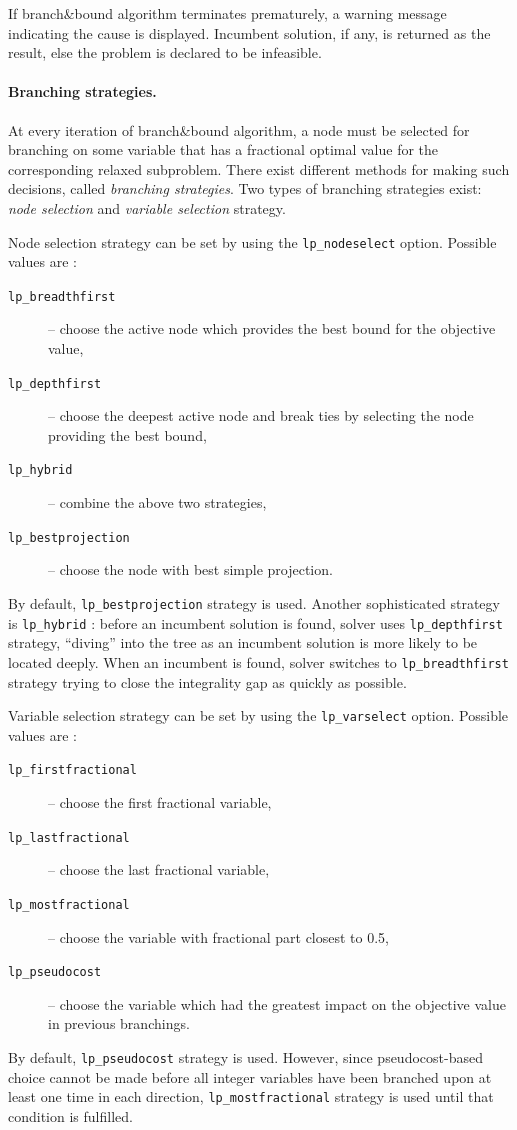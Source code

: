 \documentclass[a4paper,11pt]{book}
\begin{document}
If branch\&bound algorithm terminates prematurely, a warning message indicating the cause is displayed. Incumbent solution, if any, is returned as the result, else the problem is declared to be infeasible.

\paragraph{Branching strategies.}
At every iteration of branch\&bound algorithm, a node must be selected for branching on some variable that has a fractional optimal value for the corresponding relaxed subproblem. There exist different methods for making such decisions, called \emph{branching strategies}. Two types of branching strategies exist: \emph{node selection} and \emph{variable selection} strategy.

Node selection strategy can be set by using the {\tt lp\_nodeselect} option. Possible values are :
\begin{description}
	\item[\tt lp\_breadthfirst] -- choose the active node which provides the best bound for the objective value,
	\item[\tt lp\_depthfirst] -- choose the deepest active node and break ties by selecting the node providing the best bound,
	\item[\tt lp\_hybrid] -- combine the above two strategies,
	\item[\tt lp\_bestprojection] -- choose the node with best simple projection.
\end{description}
By default, {\tt lp\_bestprojection} strategy is used. Another sophisticated strategy is {\tt lp\_hybrid} : before an incumbent solution is found, solver uses {\tt lp\_depthfirst} strategy, ``diving'' into the tree as an incumbent solution is more likely to be located deeply. When an incumbent is found, solver switches to {\tt lp\_breadthfirst} strategy trying to close the integrality gap as quickly as possible.

Variable selection strategy can be set by using the {\tt lp\_varselect} option. Possible values are :
\begin{description}
	\item[\tt lp\_firstfractional] -- choose the first fractional variable,
	\item[\tt lp\_lastfractional] -- choose the last fractional variable,
	\item[\tt lp\_mostfractional] -- choose the variable with fractional part closest to 0.5,
	\item[\tt lp\_pseudocost] -- choose the variable which had the greatest impact on the objective value in previous branchings.
\end{description}
By default, {\tt lp\_pseudocost} strategy is used. However, since pseudocost-based choice cannot be made before all integer variables have been branched upon at least one time in each direction, {\tt lp\_mostfractional} strategy is used until that condition is fulfilled.
\end{document}

